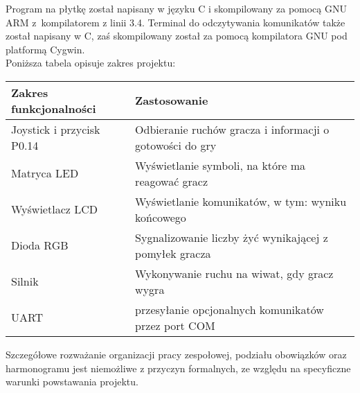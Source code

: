 \documentclass[a4paper, portrait,11pt]{article}
\begin{document}
Program na płytkę został napisany w języku C i skompilowany za pomocą GNU ARM
z~kompilatorem z linii 3.4. Terminal do odczytywania komunikatów także został
napisany w C, zaś skompilowany został za pomocą kompilatora GNU pod platformą Cygwin.\\

Poniższa tabela opisuje zakres projektu:
\begin{center}\begin{tabular}{|l|l|}
\hline
\textbf{Zakres funkcjonalności} & \textbf{Zastosowanie} \\\hline\hline
Joystick i przycisk P0.14 & Odbieranie ruchów gracza i informacji o gotowości do gry \\\hline
Matryca LED & Wyświetlanie symboli, na które ma reagować gracz \\\hline
Wyświetlacz LCD & Wyświetlanie komunikatów, w tym: wyniku końcowego \\\hline
Dioda RGB & Sygnalizowanie liczby żyć wynikającej z pomyłek gracza \\\hline
Silnik & Wykonywanie ruchu na wiwat, gdy gracz wygra \\\hline
UART & przesyłanie opcjonalnych komunikatów przez port COM \\\hline
\end{tabular}\end{center}

Szczegółowe rozważanie organizacji pracy zespołowej, podziału obowiązków
oraz harmonogramu jest niemożliwe z przyczyn formalnych, ze względu
na specyficzne warunki powstawania projektu.
\end{document}
